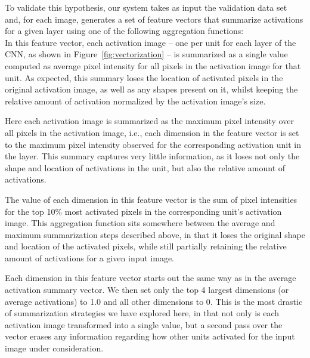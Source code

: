 To validate this hypothesis, our system takes as input the validation data set and, for each image, generates a set of feature vectors that summarize activations for a given layer using one of the following aggregation functions:\\

 In this feature vector, each activation image -- one per unit for each layer of the CNN, as shown in Figure~\ref{fig:vectorization} -- is summarized as a single value computed as average pixel intensity for all pixels in the activation image for that unit. As expected, this summary loses the location of activated pixels in the original activation image, as well as any shapes present on it, whilst keeping the relative amount of activation normalized by the activation image's size.  

 Here each activation image is summarized as the maximum pixel intensity over all pixels in the activation image, i.e., each dimension in the feature vector is set to the maximum pixel intensity observed for the corresponding activation unit in the layer.  This summary captures very little information, as it loses not only the shape and location of activations in the unit, but also the relative amount of activations.

 The value of each dimension in this feature vector is the sum of pixel intensities for the top 10\% most activated pixels in the corresponding unit's activation image.  This aggregation function sits somewhere between the average and maximum summarization steps described above, in that it loses the original shape and location of the activated pixels, while still partially retaining the relative amount of activations for a given input image.

 Each dimension in this feature vector starts out the same way as in the average activation summary vector.  We then set only the top 4 largest dimensions (or average activations) to 1.0 and all other dimensions to 0.  This is the most drastic of summarization strategies we have explored here, in that not only is each activation image transformed into a single value, but a second pass over the vector erases any information regarding how other units activated for the input image under consideration.

